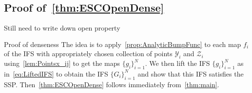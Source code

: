 \documentclass[12pt,]{article}
\def\cref#1{\ref{#1}}%
\theoremstyle{definition}
\theoremstyle{remark}
\newcommand{\0}{\mathbf{0}}
\begin{document}
{\begin{comment}
\begin{align*}
I(x)&\leq \delta \cdot \frac{|f'(y_i)|}{|f(y_i)|} \prod_{\substack{y_j\in\mathcal{Y} \\ y_j\neq y_i}} \frac{(x-y_j)^2}{(y_i - y_j)^2}  \prod_{z_j\in\mathcal{Z}} \frac{(x-z_j)^4}{(y_i - z_j)^4} \\
&\stackrel{\eqref{eq:eta1/3Bound}}{\leq}  \delta \cdot \frac{|f'(y_i)|}{|f(y_i)|}\prod_{\substack{y_j\in\mathcal{Y} \\ y_j\neq y_i}}\!\! \Big( 1+\frac{\eta_i^{1/3}}{|y_i-y_j|} \Big)^2 \prod_{z_j\in\mathcal{Z}}\!\! \Big( 1+\frac{\eta_i^{1/3}}{|y_i-z_j|} \Big)^4. 
\end{align*}
We may assume by choosing $\eta_i$ even smaller if necessary that the product of the final two products is at most say 2. Since we also assume that $f([0,1])\subset (0,1)$ and $0<|f'(x)|<1$ for every $x$, we have shown that $I(x)\leq C\cdot\delta+\varepsilon$ for some constant $C>0$ depending only $f$. This completes the bound for $\| \varphi'' \psi A\|_{\infty}$. 

{\color{red} Quick finish: The argument for bounding $\| \varphi \psi A''\|_{\infty}$ and $2\| \varphi' \psi A'\|_{\infty}$ is completely analogous and is omitted. Or we need to add another 1.5-2 pages. If omitted, then we can change condition~\cref{eq:etaOtherBound} slightly.}
\end{proof}
\end{comment}
\subsection{Proof of~\cref{thm:ESCOpenDense}}

{\color{red}Still need to write down open property}

{\color{red}Proof of denseness} The idea is to apply~\cref{prop:AnalyticBumpFunc} to each map $f_i$
of the IFS with appropriately chosen collection of points $\mathcal{Y}_i$ and $\mathcal{Z}_i$
using~\cref{lem:Pointsx_ij} to get the maps $\{g_i\}_{i=1}^N$. We then lift the IFS
$\{g_i\}_{i=1}^N$ as in~\cref{eq:LiftedIFS} to obtain the IFS $\{G_i\}_{i=1}^N$ and show that this
IFS satisfies the SSP. Then~\cref{thm:ESCOpenDense} follows immediately from~\cref{thm:main}.

}
\end{document}
